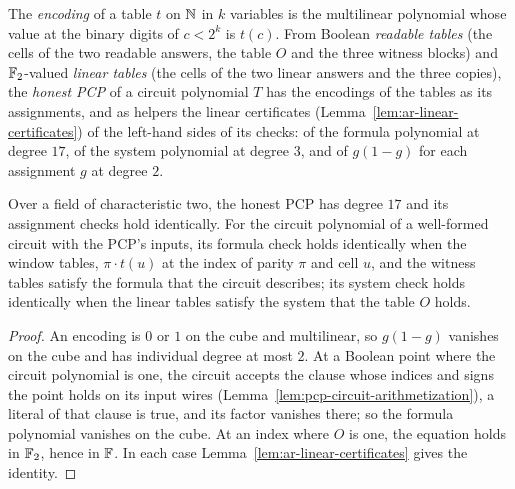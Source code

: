\begin{definition}
\label{def:ar-induce}
\leanok
The \emph{encoding} of a table $t$ on $\mathbb{N}$ in $k$ variables is the multilinear polynomial whose
value at the binary digits of $c < 2^k$ is $t(c)$. From Boolean \emph{readable tables} (the cells
of the two readable answers, the table $O$ and the three witness blocks) and $\mathbb{F}_2$-valued
\emph{linear tables} (the cells of the two linear answers and the three copies), the \emph{honest
PCP} of a circuit polynomial $T$ has the encodings of the tables as its assignments, and as
helpers the linear certificates (Lemma~\ref{lem:ar-linear-certificates}) of the left-hand sides
of its checks: of the formula polynomial at degree $17$, of the system polynomial at degree $3$,
and of $g(1 - g)$ for each assignment $g$ at degree $2$.
\end{definition}

\begin{lemma}
\label{lem:ar-pcp-complete}
\leanok
Over a field of characteristic two, the honest PCP has degree $17$ and its assignment checks hold
identically. For the circuit polynomial of a well-formed circuit with the PCP's inputs, its
formula check holds identically when the window tables, $\pi \cdot t(u)$ at the index of parity
$\pi$ and cell $u$, and the witness tables satisfy the formula that the circuit describes; its
system check holds identically when the linear tables satisfy the system that the table $O$
holds.
\end{lemma}

\begin{proof}
\leanok
An encoding is $0$ or $1$ on the cube and multilinear, so $g(1 - g)$ vanishes on the cube and has
individual degree at most $2$. At a Boolean point where the circuit polynomial is one, the
circuit accepts the clause whose indices and signs the point holds on its input wires
(Lemma~\ref{lem:pcp-circuit-arithmetization}), a literal of that clause is true, and its factor
vanishes there; so the formula polynomial vanishes on the cube. At an index where $O$ is one,
the equation holds in $\mathbb{F}_2$, hence in $\mathbb{F}$. In each case
Lemma~\ref{lem:ar-linear-certificates} gives the identity.
\end{proof}

